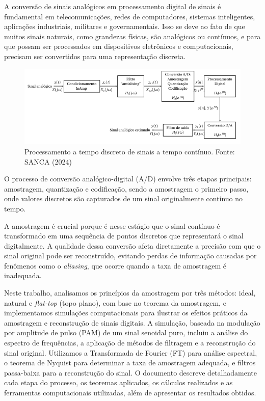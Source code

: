 A conversão de sinais analógicos em processamento digital de sinais é fundamental em telecomunicações, redes de computadores, sistemas inteligentes, aplicações industriais, militares e governamentais. Isso se deve ao fato de que muitos sinais naturais, como grandezas físicas, são analógicos ou contínuos, e para que possam ser processados em dispositivos eletrônicos e computacionais, precisam ser convertidos para uma representação discreta. 

\begin{figure}[H]
    \centering
    \includegraphics[width=1\linewidth]{image.png}
    \caption{Processamento a tempo discreto de sinais a tempo contínuo. Fonte: SANCA (2024)}
    \label{fig:enter-label}
\end{figure}
O processo de conversão analógico-digital (A/D) envolve três etapas principais: amostragem, quantização e codificação, sendo a amostragem o primeiro passo, onde valores discretos são capturados de um sinal originalmente contínuo no tempo.

A amostragem é crucial porque é nesse estágio que o sinal contínuo é transformado em uma sequência de pontos discretos que representará o sinal digitalmente. A qualidade dessa conversão afeta diretamente a precisão com que o sinal original pode ser reconstruído, evitando perdas de informação causadas por fenômenos como o \textit{aliasing}, que ocorre quando a taxa de amostragem é inadequada.

Neste trabalho, analisamos os princípios da amostragem por três métodos: ideal, natural e \textit{flat-top} (topo plano), com base no teorema da amostragem, e implementamos simulações computacionais para ilustrar os efeitos práticos da amostragem e reconstrução de sinais digitais. A simulação, baseada na modulação por amplitude de pulso (PAM) de um sinal senoidal puro, incluiu a análise do espectro de frequências, a aplicação de métodos de filtragem e a reconstrução do sinal original. Utilizamos a Transformada de Fourier (FT) para análise espectral, o teorema de Nyquist para determinar a taxa de amostragem adequada, e filtros passa-baixa para a reconstrução do sinal. O documento descreve detalhadamente cada etapa do processo, os teoremas aplicados, os cálculos realizados e as ferramentas computacionais utilizadas, além de apresentar os resultados obtidos.
